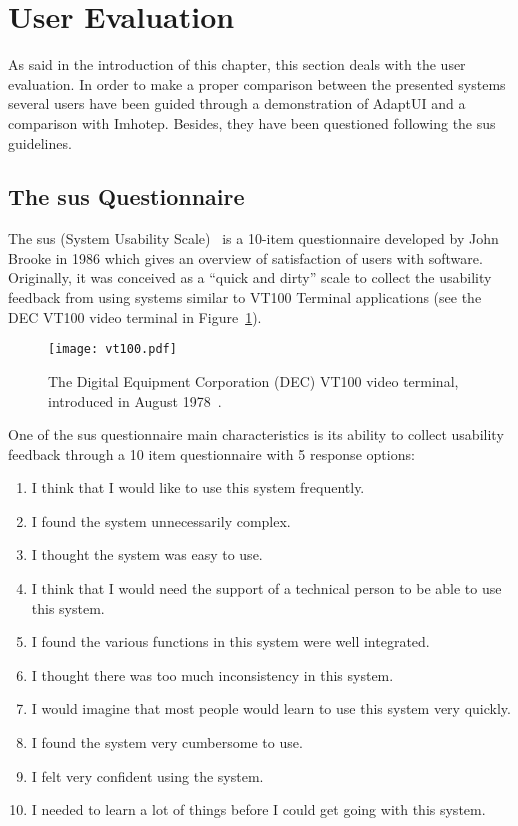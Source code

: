 \section{User Evaluation}
\label{sec:user_evaluation}

As said in the introduction of this chapter, this section deals with the user 
evaluation. In order to make a proper comparison between the presented systems 
several users have been guided through a demonstration of AdaptUI and a 
comparison with Imhotep. Besides, they have been questioned following the \ac{sus} 
guidelines.

\subsection{The \ac{sus} Questionnaire}
\label{sec:sus}
The \ac{sus} (System Usability Scale)~\citep{sus} is a 10-item questionnaire 
developed by John Brooke in 1986 which gives an overview of satisfaction of 
users with software. Originally, it was conceived as a ``quick and dirty'' 
scale to collect the usability feedback from using systems similar to VT100 
Terminal applications (see the DEC VT100 video terminal in 
Figure~\ref{fig:vt100}).

\begin{figure}
\centering
\texttt{[image: vt100.pdf]}
\caption{The Digital Equipment Corporation (DEC) VT100 video terminal, 
introduced in August 1978~\citep{vt100}.}
\label{fig:vt100}
\end{figure}

One of the \ac{sus} questionnaire main characteristics is its ability to collect
usability feedback through a 10 item questionnaire with 5 response options: 

\begin{enumerate}
 \item I think that I would like to use this system frequently.
 \item I found the system unnecessarily complex.
 \item I thought the system was easy to use.
 \item I think that I would need the support of a technical person to be able to
 use this system.
 \item I found the various functions in this system were well integrated.
 \item I thought there was too much inconsistency in this system.
 \item I would imagine that most people would learn to use this system very
 quickly.
 \item I found the system very cumbersome to use.
 \item I felt very confident using the system.
 \item I needed to learn a lot of things before I could get going with this
 system.
\end{enumerate}

